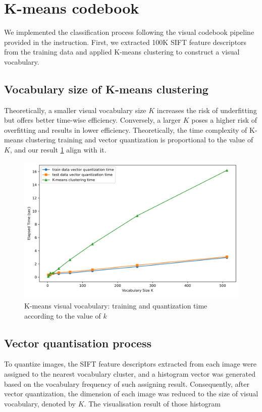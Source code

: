\section{K-means codebook}
\label{sec:intro}

We implemented the classification process following the visual codebook pipeline provided in the instruction. First, we extracted 100K SIFT feature descriptors from the training data and applied K-means clustering to construct a visual vocabulary.

\subsection{Vocabulary size of K-means clustering}
Theoretically, a smaller visual vocabulary size $K$ increases the risk of underfitting but offers better time-wise efficiency. Conversely, a larger $K$ poses a higher risk of overfitting and results in lower efficiency. Theoretically, the time complexity of K-means clustering training and vector quantization is proportional to the value of $K$, and our result \cref{fig:q1-fig1} align with it.

\begin{figure}[htbp]
	\centering
	\includegraphics[width=0.5\linewidth]{image/q1-fig1.png}
	\caption{K-means visual vocabulary: training and quantization time according to the value of $k$}
	\label{fig:q1-fig1}
\end{figure}

\subsection{Vector quantisation process}
 To quantize images, the SIFT feature descriptors extracted from each image were assigned to the nearest vocabulary cluster, and a histogram vector was generated based on the vocabulary frequency of such assigning result. Consequently, after vector quantization, the dimension of each image was reduced to the size of visual vocabulary, denoted by $K$. The visualisation result of those histogram 
 